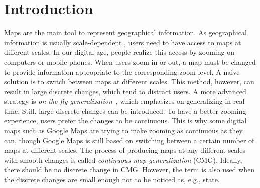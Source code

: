 \documentclass[acmsmall,natbib=false]{acmart}
\begin{document}



\maketitle

\section{Introduction}
\label{sec:Introduction}

Maps are the main tool to represent geographical information. 
As geographical information is usually scale-dependent
\parencite{Muller1995Generalization,Weibel1997}, 
users need to have access to maps at different scales.
In our digital age, people realize this access by zooming on 
computers or mobile phones.
When users zoom in or out, 
a map must be changed to provide information 
appropriate to the corresponding zoom level.
A naive solution is 
to switch between maps at different scales.
This method, however, can result in 
large discrete changes, 
which tend to distract users.
A more advanced strategy is  
\emph{on-the-fly generalization}~\parencite{Weibel2017Fly},
which emphasizes on generalizing in real time.
Still, large discrete changes can be introduced.
To have a better zooming experience, 
users prefer the changes to be continuous.
This is why some digital maps such as Google Maps 
are trying to make zooming as continuous as they can,
though Google Maps is still based on switching between 
a certain number of maps at different scales.
The process of producing maps at any different scales
with smooth changes 
is called \emph{continuous map generalization} (CMG).
Ideally, there should be no discrete change in CMG.
However, the term is also used when 
the discrete changes are small enough not to be noticed as,
e.g., \textcite{Suba2016Road} state.
\end{document}
